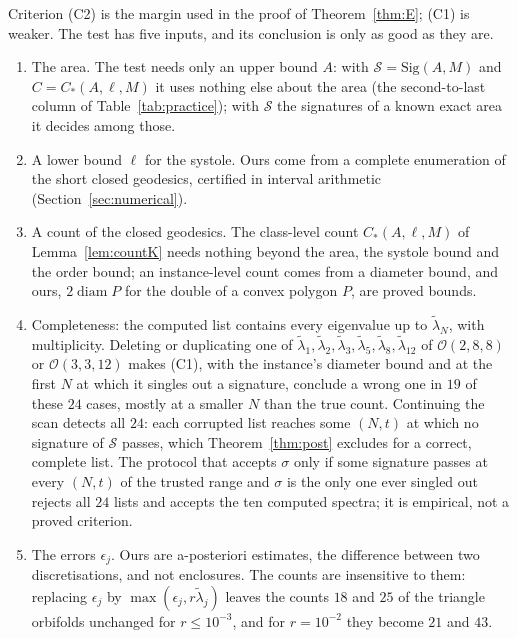 \documentclass[pdflatex,sn-mathphys-num]{sn-jnl}
\theoremstyle{thmstyleone}%
\theoremstyle{thmstylethree}%
\newcommand{\Orb}{\mathcal{O}}
\newcommand{\Sig}{\mathrm{Sig}}
\newcommand{\diam}{\operatorname{diam}}
\begin{document}
Criterion (C2) is the margin used in the proof of Theorem~\ref{thm:E}; (C1) is weaker. The test has five inputs, and its conclusion is only as good as they are.
\begin{enumerate}[label=(\roman*)]
\item The area. The test needs only an upper bound $A$: with $\mathcal S=\Sig(A,M)$ and $C=C_*(A,\ell,M)$ it uses nothing else about the area (the second-to-last column of Table~\ref{tab:practice}); with $\mathcal S$ the signatures of a known exact area it decides among those.
\item A lower bound $\ell$ for the systole. Ours come from a complete enumeration of the short closed geodesics, certified in interval arithmetic (Section~\ref{sec:numerical}).
\item A count of the closed geodesics. The class-level count $C_*(A,\ell,M)$ of Lemma~\ref{lem:countK} needs nothing beyond the area, the systole bound and the order bound; an instance-level count comes from a diameter bound, and ours, $2\diam P$ for the double of a convex polygon $P$, are proved bounds.
\item Completeness: the computed list contains every eigenvalue up to $\tilde\lambda_N$, with multiplicity. Deleting or duplicating one of $\tilde\lambda_1,\tilde\lambda_2,\tilde\lambda_3,\tilde\lambda_5,\tilde\lambda_8,\tilde\lambda_{12}$ of $\Orb(2,8,8)$ or $\Orb(3,3,12)$ makes (C1), with the instance's diameter bound and at the first $N$ at which it singles out a signature, conclude a wrong one in $19$ of these $24$ cases, mostly at a smaller $N$ than the true count. Continuing the scan detects all $24$: each corrupted list reaches some $(N,t)$ at which no signature of $\mathcal S$ passes, which Theorem~\ref{thm:post} excludes for a correct, complete list. The protocol that accepts $\sigma$ only if some signature passes at every $(N,t)$ of the trusted range and $\sigma$ is the only one ever singled out rejects all $24$ lists and accepts the ten computed spectra; it is empirical, not a proved criterion.
\item The errors $\epsilon_j$. Ours are a-posteriori estimates, the difference between two discretisations, and not enclosures. The counts are insensitive to them: replacing $\epsilon_j$ by $\max(\epsilon_j,r\tilde\lambda_j)$ leaves the counts $18$ and $25$ of the triangle orbifolds unchanged for $r\le10^{-3}$, and for $r=10^{-2}$ they become $21$ and $43$.
\end{enumerate}
\end{document}
